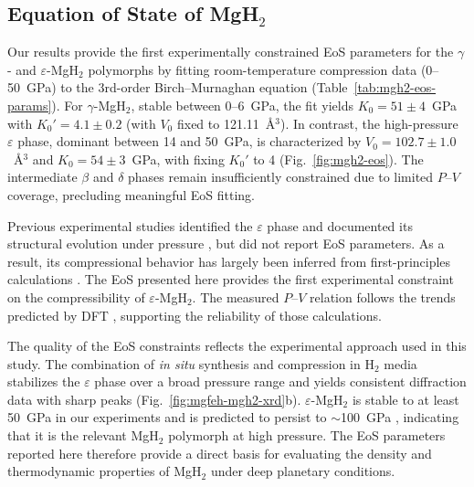 \documentclass[draft,jgrga,12pt]{agujournal2019}
\begin{document}
\subsection{Equation of State of MgH$_2$}

Our results provide the first experimentally constrained EoS parameters for the $\gamma$- and $\varepsilon$-MgH$_2$ polymorphs by fitting room-temperature compression data (0--50~{GPa}) to the 3rd-order Birch–Murnaghan equation (Table~\ref{tab:mgh2-eos-params}). 
For $\gamma$-MgH$_2$, stable between 0–6~{GPa}, the fit yields $K_0=51\pm4$~GPa with $K_0'=4.1\pm0.2$ (with $V_0$ fixed to 121.11~Å$^3$). 
In contrast, the high-pressure $\varepsilon$ phase, dominant between 14 and 50~GPa, is characterized by $V_0=102.7\pm1.0$~Å$^3$ and $K_0=54\pm3$~GPa, with fixing $K_0'$ to 4 (Fig.~\ref{fig:mgh2-eos}). 
The intermediate $\beta$ and $\delta$ phases remain insufficiently constrained due to limited $P$–$V$ coverage, precluding meaningful EoS fitting. 

Previous experimental studies identified the $\varepsilon$ phase and documented its structural evolution under pressure \cite{moriwaki_structural_2006}, but did not report EoS parameters. 
As a result, its compressional behavior has largely been inferred from first-principles calculations \cite{cui_structural_2008}. 
The EoS presented here provides the first experimental constraint on the compressibility of $\varepsilon$-MgH$_2$. 
The measured $P$–$V$ relation follows the trends predicted by DFT \cite{cui_structural_2008}, supporting the reliability of those calculations.

The quality of the EoS constraints reflects the experimental approach used in this study. The combination of \textit{in situ} synthesis and compression in H$_2$ media stabilizes the $\varepsilon$ phase over a broad pressure range and yields consistent diffraction data with sharp peaks (Fig.~\ref{fig:mgfeh-mgh2-xrd}b). $\varepsilon$-MgH$_2$ is stable to at least 50~{GPa} in our experiments and is predicted to persist to $\sim$100~{GPa} \cite{cui_structural_2008}, indicating that it is the relevant MgH$_2$ polymorph at high pressure. The EoS parameters reported here therefore provide a direct basis for evaluating the density and thermodynamic properties of MgH$_2$ under deep planetary conditions.


\end{document}
